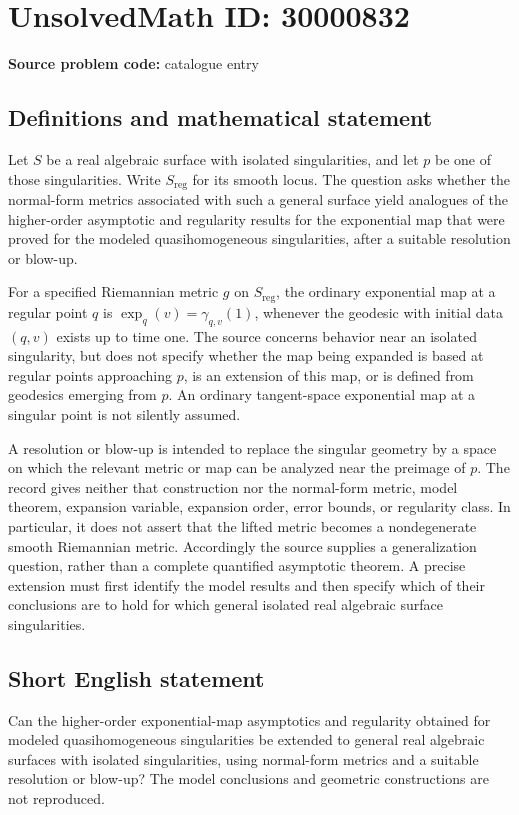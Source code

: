 \documentclass[11pt]{article}
\begin{document}
\section*{UnsolvedMath ID: 30000832}
\textbf{Source problem code:} catalogue entry
\subsection{Definitions and mathematical statement}
Let \(S\) be a real algebraic surface with isolated singularities, and let \(p\) be one of those singularities. Write \(S_{\mathrm{reg}}\) for its smooth locus. The question asks whether the normal-form metrics associated with such a general surface yield analogues of the higher-order asymptotic and regularity results for the exponential map that were proved for the modeled quasihomogeneous singularities, after a suitable resolution or blow-up.

For a specified Riemannian metric \(g\) on \(S_{\mathrm{reg}}\), the ordinary exponential map at a regular point \(q\) is \(\exp_q(v)=\gamma_{q,v}(1)\), whenever the geodesic with initial data \((q,v)\) exists up to time one. The source concerns behavior near an isolated singularity, but does not specify whether the map being expanded is based at regular points approaching \(p\), is an extension of this map, or is defined from geodesics emerging from \(p\). An ordinary tangent-space exponential map at a singular point is not silently assumed.

A resolution or blow-up is intended to replace the singular geometry by a space on which the relevant metric or map can be analyzed near the preimage of \(p\). The record gives neither that construction nor the normal-form metric, model theorem, expansion variable, expansion order, error bounds, or regularity class. In particular, it does not assert that the lifted metric becomes a nondegenerate smooth Riemannian metric. Accordingly the source supplies a generalization question, rather than a complete quantified asymptotic theorem. A precise extension must first identify the model results and then specify which of their conclusions are to hold for which general isolated real algebraic surface singularities.
\subsection{Short English statement}
Can the higher-order exponential-map asymptotics and regularity obtained for modeled quasihomogeneous singularities be extended to general real algebraic surfaces with isolated singularities, using normal-form metrics and a suitable resolution or blow-up? The model conclusions and geometric constructions are not reproduced.
\end{document}

